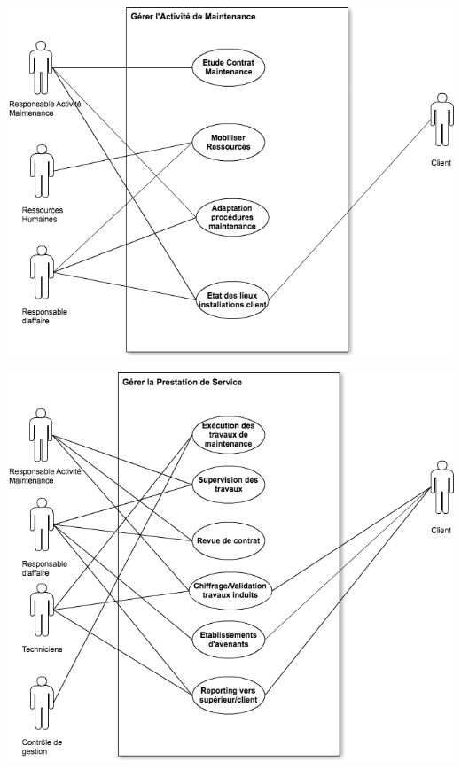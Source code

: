 \begin {center}
\includegraphics[width=\textwidth]{png/DCUGererActiMaintenance.png}
\end {center}

\begin {center}
\includegraphics[width=\textwidth]{png/DCUGererPrestationService.png}
\end {center}

